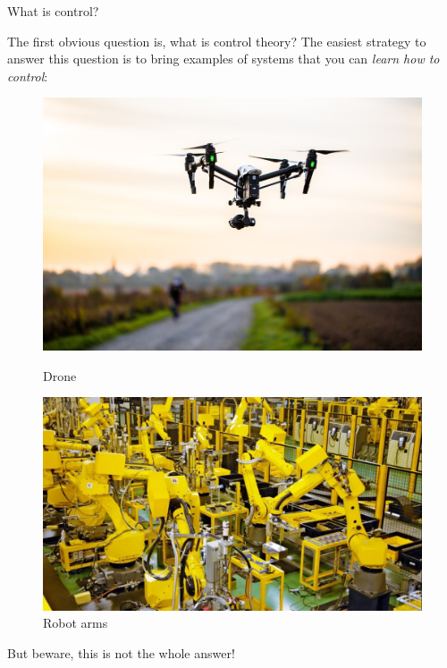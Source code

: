 \documentclass{beamer}
\begin{document}
\begin{frame}{What is control?}
\begin{flushleft}

The first obvious question is, what is control theory? The easiest strategy to answer this question is to bring examples of systems that you can \emph{learn how to control}:

\begin{figure}
  \includegraphics[width=\linewidth]{Picture1.jpg}
  \caption{Drone}
\endminipage\hfill
{}
  \includegraphics[width=\linewidth]{Picture2.jpg}
  \caption{Robot arms}
\endminipage

\end{figure}

But beware, this is not the whole answer!

\end{flushleft}
\end{frame}
\end{document}
